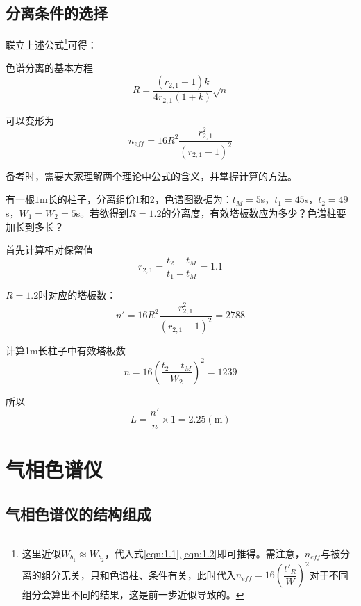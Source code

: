 \subsection{分离条件的选择}
联立上述公式\footnote{这里近似$W_{b_1}\approx W_{b_2}$，代入式\eqref{eqn:1.1},\eqref{eqn:1.2}即可推得。需注意，$n_{eff}$与被分离的组分无关，只和色谱柱、条件有关，此时代入$n_{eff}=16{\left(\dfrac{t'_R}{W}\right)}^2$对于不同组分会算出不同的结果，这是前一步近似导致的。}可得：

\begin{theorem*}{色谱分离的基本方程}{}
	\begin{equation}
		R=\dfrac{(r_{2,1}-1)k}{4r_{2,1} (1+k)} \sqrt{n}
	\end{equation}
	
	可以变形为
	\begin{equation}
		n_{eff}=16R^2\dfrac{r_{2,1}^2}{(r_{2,1}-1)^2}
	\end{equation}
\end{theorem*}

备考时，需要大家理解两个理论中公式的含义，并掌握计算的方法。
\vspace{3pt}
\begin{example}
	有一根$1$m长的柱子，分离组份1和2，色谱图数据为：$t_M=5$s，$t_1=45$s，$t_2=49$s，$W_1=W_2=5$s。若欲得到$R=1.2$的分离度，有效塔板数应为多少？色谱柱要加长到多长？
	
	\solve 
	首先计算相对保留值$$r_{2,1}=\dfrac{t_2-t_M}{t_1-t_M}=1.1$$
	
	$R=1.2$时对应的塔板数：$$n'=16R^2\dfrac{r_{2,1}^2}{(r_{2,1}-1)^2}=2788$$
	
	计算1m长柱子中有效塔板数$$n=16{\left(\dfrac{t_2-t_M}{W_2}\right)}^2=1239$$
	
	所以$$L=\dfrac{n'}{n}\times 1=2.25(\mathrm{m})$$
	
\end{example}


\section{气相色谱仪}
\subsection{气相色谱仪的结构组成}

